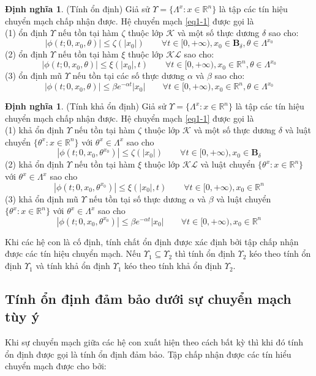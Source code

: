 \documentclass[14pt,a4paper,oneside]{report}		%
\theoremstyle{definition}
\newtheorem{define}[theorem]{Định nghĩa}
\begin{document}
\begin{define} \label{def1-1} (Tính ổn định) Giả sử $\Upsilon = \{\Lambda^x:x\in\mathbb{R}^n\}$ là tập các tín hiệu chuyển mạch chấp nhận được. Hệ chuyển mạch \ref{eq1-1} được gọi là \\
(1) ổn định $\Upsilon$ nếu tồn tại hàm $\zeta$ thuộc lớp $\mathcal{K}$ và một số thực dương $\delta$ sao cho:
$$|\phi(t;0,x_0,\theta)|\leq\zeta(|x_0|)\qquad\forall t \in [0,+\infty ), x_0 \in\mathbf{B}_\delta , \theta \in\Lambda^{x_0}$$
(2) ổn định $\Upsilon$ nếu tồn tại hàm $\xi$ thuộc lớp $\mathcal{KL}$ sao cho:
$$|\phi(t;0,x_0,\theta)|\leq\xi(|x_0|,t)\qquad\forall t \in [0,+\infty ), x_0 \in\mathbb{R}^n , \theta \in\Lambda^{x_0}$$
(3) ổn định mũ $\Upsilon$ nếu tồn tại các số thực dương $\alpha$ và $\beta$ sao cho:
$$|\phi(t;0,x_0,\theta)|\leq \beta e^{-\alpha t}|x_0|\qquad\forall t \in [0,+\infty ), x_0 \in\mathbb{R}^n , \theta \in\Lambda^{x_0}$$
\end{define}

\begin{define} (Tính khả ổn định) Giả sử $\Upsilon = \{\Lambda^x:x\in\mathbb{R}^n\}$ là tập các tín hiệu chuyển mạch chấp nhận được. Hệ chuyển mạch \ref{eq1-1} được gọi là \\
(1) khả ổn định $\Upsilon$ nếu tồn tại hàm $\zeta$ thuộc lớp $\mathcal{K}$ và một số thực dương $\delta$ và luật chuyển $\{\theta^x:x\in\mathbb{R}^n\}$ với $\theta^x\in\Lambda^x$ sao cho
$$|\phi(t;0,x_0,\theta^{x_0})|\leq\zeta(|x_0|)\qquad\forall t \in [0,+\infty ), x_0 \in\mathbf{B}_\delta$$
(2) khả ổn định $\Upsilon$ nếu tồn tại hàm $\xi$ thuộc lớp $\mathcal{KL}$ và luật chuyển $\{\theta^x:x\in\mathbb{R}^n\}$ với $\theta^x\in\Lambda^x$ sao cho
$$|\phi(t;0,x_0,\theta^{x_0})|\leq\xi(|x_0|,t)\qquad\forall t \in [0,+\infty ), x_0 \in\mathbb{R}^n$$
(3) khả ổn định mũ $\Upsilon$ nếu tồn tại số thực dương $\alpha$ và $\beta$ và luật chuyển $\{\theta^x:x\in\mathbb{R}^n\}$ với $\theta^x\in\Lambda^x$ sao cho
$$|\phi(t;0,x_0,\theta^{x_0})|\leq \beta e^{-\alpha t}|x_0|\qquad\forall t \in [0,+\infty ), x_0 \in\mathbb{R}^n$$
\end{define}

Khi các hệ con là cố định, tính chất ổn định được xác định bởi tập chấp nhận được các tín hiệu chuyển mạch. Nếu $\Upsilon_1\subseteq\Upsilon_2$ thì tính ổn định $\Upsilon_2$ kéo theo tính ổn định $\Upsilon_1$ và tính khả ổn định $\Upsilon_1$ kéo theo tính khả ổn định $\Upsilon_2$.

\subsection{Tính ổn định đảm bảo dưới sự chuyển mạch tùy ý}
Khi sự chuyển mạch giữa các hệ con xuất hiện theo cách bất kỳ thì khi đó tính ổn định được gọi là tính ổn định đảm bảo. Tập chấp nhận được các tín hiểu chuyển mạch được cho bởi:
\end{document}
